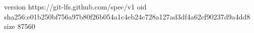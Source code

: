 version https://git-lfs.github.com/spec/v1
oid sha256:e01b250bf756a97b80f26b054a1c4eb24c728a127ad3df4a62cf90237d9a4dd8
size 87560
